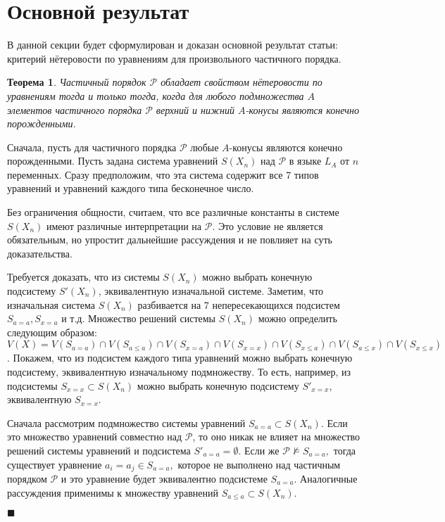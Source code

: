 \documentclass[12pt]{article}
\theoremstyle{break}
\newtheorem{Th}{Теорема}
\newenvironment{Proof} %
	{\par\noindent{\bf Доказательство.}} %
	{\hfill$\scriptstyle\blacksquare$} %
\def\P{\mathcal{P}}
\begin{document}
	
	\section{Основной результат}
		В данной секции будет сформулирован и доказан основной результат статьи: критерий нётеровости по уравнениям для произвольного частичного порядка.

		\begin{Th}\label{criterion}
			Частичный порядок $\P$ обладает свойством нётеровости по уравнениям тогда и только тогда, когда для любого подмножества $A$ элементов частичного порядка $\P$ верхний и нижний $A$-конусы являются конечно порожденными.
		\end{Th}

		\begin{Proof}
			Сначала, пусть для частичного порядка $\P$ любые $A$-конусы являются конечно порожденными. Пусть задана система уравнений $S(X_n)$ над $\P$ в языке $L_A$ от $n$ переменных. Сразу предположим, что эта система содержит все 7 типов уравнений и уравнений каждого типа бесконечное число.

			Без ограничения общности, считаем, что все различные константы в системе $S(X_n)$ имеют различные интерпретации на $\P$. Это условие не является обязательным, но упростит дальнейшие рассуждения и не повлияет на суть доказательства.

			Требуется доказать, что из системы $S(X_n)$ можно выбрать конечную подсистему $S'(X_n)$, эквивалентную  изначальной системе. Заметим, что изначальная система $S(X_n)$ разбивается на 7 непересекающихся подсистем $S_{a=a}, S_{x=a}$ и т.д. Множество решений системы $S(X_n)$ можно определить следующим образом: $V(X) = V(S_{a=a})\cap V(S_{a\leqslant a})\cap V(S_{x=a})\cap V(S_{x=x})\cap V(S_{x\leqslant a})\cap V(S_{a\leqslant x})\cap V(S_{x\leqslant x})$. Покажем, что из подсистем каждого типа уравнений можно выбрать конечную подсистему, эквивалентную изначальному подмножеству. То есть, например, из подсистемы $S_{x=x}\subset S(X_n)$ можно выбрать конечную подсистему $S'_{x=x}$, эквивалентную $S_{x=x}$.

			Сначала рассмотрим подмножество системы уравнений $S_{a=a}\subset S(X_n)$. Если это множество уравнений совместно над $\P$, то оно никак не влияет на множество решений системы уравнений и подсистема $S'_{a=a} = \emptyset$. Если же $\P\nvDash S_{a=a},$ тогда существует уравнение $a_i=a_j\in S_{a=a},$ которое не выполнено над частичным порядком $\P$ и это уравнение будет эквивалентно подсистеме $S_{a=a}$. Аналогичные рассуждения применимы к множеству уравнений $S_{a\leqslant a}\subset S(X_n).$


\end{Proof}
\end{document}
